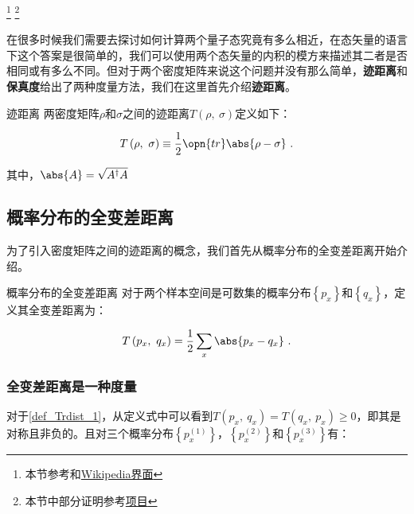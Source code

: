 


\footnote{本节参考\cite{量子信息}和\href{https://en.wikipedia.org/wiki/Trace_distance}{Wikipedia界面}}
\footnote{本节中部分证明参考\href{https://github.com/goropikari/SolutionQCQINielsenChuang}{项目}}


在很多时候我们需要去探讨如何计算两个量子态究竟有多么相近，在态矢量的语言下这个答案是很简单的，我们可以使用两个态矢量的内积的模方来描述其二者是否相同或有多么不同。但对于两个密度矩阵来说这个问题并没有那么简单，\textbf{迹距离}和\textbf{保真度}给出了两种度量方法，我们在这里首先介绍\textbf{迹距离}。

\begin{definition}{迹距离}\label{def_Trdist_1}
两密度矩阵$\rho$和$\sigma$之间的迹距离$T\left(\rho,~\sigma\right)$定义如下：

\begin{equation}
T\left(\rho,~\sigma\right) \equiv \frac{1}{2} \opn{tr}\abs{\rho - \sigma}~.
\end{equation}

其中，$\abs{A} = \sqrt{A^\dagger A}$

\end{definition}

\subsection{概率分布的全变差距离}

为了引入密度矩阵之间的迹距离的概念，我们首先从概率分布的全变差距离开始介绍。

\begin{definition}{概率分布的全变差距离}
对于两个样本空间是可数集的概率分布$\left\{ p_x \right\}$和$\left\{q_x\right\}$，定义其全变差距离为：

\begin{equation}\label{eq_Trdist_1}
T\left( p_x,~q_x \right) = \frac{1}{2}\sum_x\abs{p_x - q_x}~.
\end{equation}

\end{definition}

\subsubsection{全变差距离是一种度量}

对于\autoref{def_Trdist_1}，从定义式中可以看到$T\left(p_x,~q_x\right) = T\left(q_x,~p_x\right)\geqslant 0$，即其是对称且非负的。且对三个概率分布$\left\{p_x^{(1)}\right\}$，$\left\{p_x^{(2)}\right\}$和$\left\{p_x^{(3)}\right\}$有：

